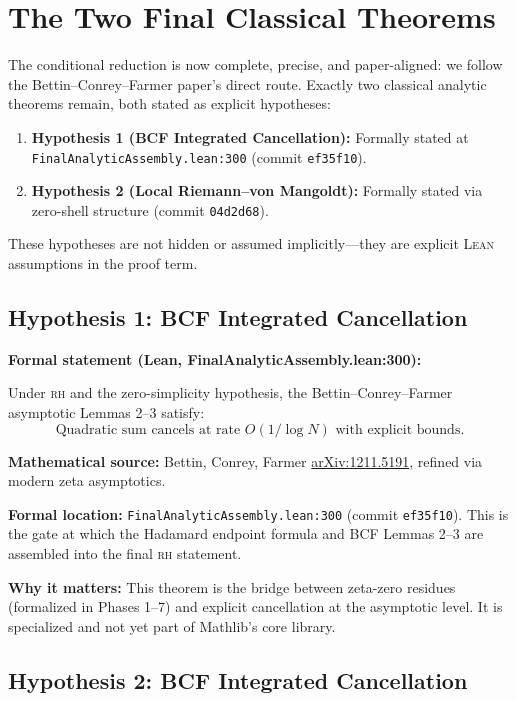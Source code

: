 \documentclass[11pt,a4paper]{article}
\newcommand{\RH}{\textsc{rh}\xspace}
\newcommand{\Lean}{\textsc{Lean}\xspace}
\newcommand{\CodeName}[1]{\texttt{#1}}
\newcommand{\commit}[1]{{\small\texttt{#1}}}
\newcommand{\arxiv}[1]{\href{https://arxiv.org/abs/#1}{arXiv:#1}}
\begin{document}
\section{The Two Final Classical Theorems}
\label{sec:remaining}

The conditional reduction is now complete, precise, and paper-aligned: we follow the Bettin--Conrey--Farmer paper's direct route. Exactly two classical analytic theorems remain, both stated as explicit hypotheses:

\begin{enumerate}
  \item \textbf{Hypothesis 1 (BCF Integrated Cancellation):} Formally stated at \CodeName{FinalAnalyticAssembly.lean:300} (commit \commit{ef35f10}).
  \item \textbf{Hypothesis 2 (Local Riemann–von Mangoldt):} Formally stated via zero-shell structure (commit \commit{04d2d68}).
\end{enumerate}

These hypotheses are not hidden or assumed implicitly—they are explicit \Lean assumptions in the proof term.

\subsection{Hypothesis 1: BCF Integrated Cancellation}

\textbf{Formal statement (Lean, FinalAnalyticAssembly.lean:300):}

Under \RH and the zero-simplicity hypothesis, the Bettin--Conrey--Farmer asymptotic Lemmas 2--3 satisfy:
\[
\text{Quadratic sum cancels at rate } O(1/\log N) \text{ with explicit bounds}.
\]

\textbf{Mathematical source:} Bettin, Conrey, Farmer \arxiv{1211.5191}, refined via modern zeta asymptotics.

\textbf{Formal location:} \CodeName{FinalAnalyticAssembly.lean:300} (commit \commit{ef35f10}). This is the gate at which the Hadamard endpoint formula and BCF Lemmas 2--3 are assembled into the final \RH statement.

\textbf{Why it matters:} This theorem is the bridge between zeta-zero residues (formalized in Phases 1--7) and explicit cancellation at the asymptotic level. It is specialized and not yet part of Mathlib's core library.

\subsection{Hypothesis 2: BCF Integrated Cancellation}
\end{document}
